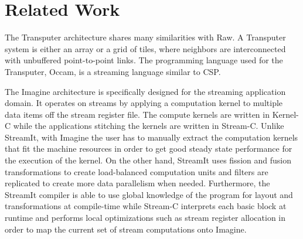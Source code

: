 \section{Related Work}
\label{sec:related}

The Transputer architecture shares many similarities with Raw.  A
Transputer system is either an array or a grid of tiles, where
neighbors are interconnected with unbuffered point-to-point links. The
programming language used for the Transputer, Occam, is a streaming
language similar to CSP.

The Imagine architecture is specifically designed for the streaming
application domain.  It operates on streams by applying a computation
kernel to multiple data items off the stream register file.  The
compute kernels are written in Kernel-C while the applications
stitching the kernels are written in Stream-C.  Unlike StreamIt, with
Imagine the user has to manually extract the computation kernels that
fit the machine resources in order to get good steady state
performance for the execution of the kernel.  On the other hand,
StreamIt uses fission and fusion transformations to create
load-balanced computation units and filters are replicated to create
more data parallelism when needed.  Furthermore, the StreamIt compiler
is able to use global knowledge of the program for layout and
transformations at compile-time while Stream-C interprets each basic
block at runtime and performs local optimizations such as stream
register allocation in order to map the current set of stream
computations onto Imagine.

% 
%
